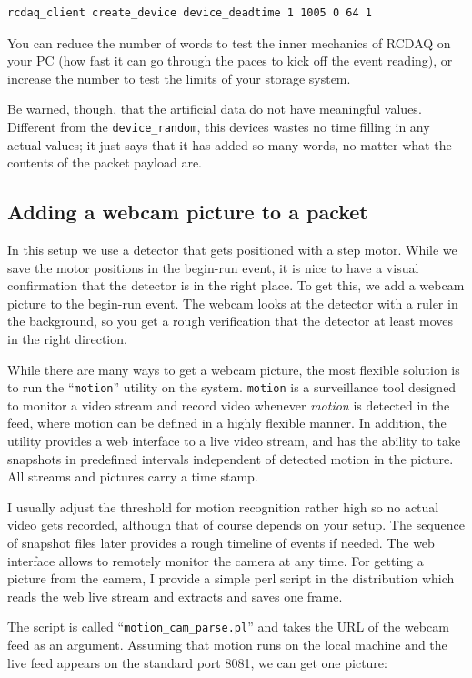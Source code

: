 \documentclass{article}[11pt]
\begin{document}
\begin{verbatim}
rcdaq_client create_device device_deadtime 1 1005 0 64 1
\end{verbatim}

You can reduce the number of words to test the inner mechanics of
RCDAQ on your PC (how fast it can go through the paces to kick off the
event reading), or increase the number to test the limits of your
storage system. 

Be warned, though, that the artificial data do not have meaningful
values. Different from the \verb|device_random|, this devices wastes
no time filling in any actual values; it just says that it has added
so many words, no matter what the contents of the packet payload are.

\subsection{Adding a webcam picture to a packet}

In this setup we use a detector that gets positioned with a step
motor. While we save the motor positions in the begin-run event, it is
nice to have a visual confirmation that the detector is in the right
place. To get this, we add a webcam picture to the begin-run
event. The webcam looks at the detector with a ruler in the
background, so you get a rough verification that the detector at least
moves in the right direction.

While there are many ways to get a webcam picture, the most flexible
solution is to run the ``\verb|motion|'' utility on the
system. \verb|motion| is a surveillance tool designed to monitor a
video stream and record video whenever \emph{motion} is detected in
the feed, where motion can be defined in a highly flexible manner. In
addition, the utility provides a web interface to a live video stream,
and has the ability to take snapshots in predefined intervals
independent of detected motion in the picture. All streams and
pictures carry a time stamp.

I usually adjust the threshold for motion recognition rather high so
no actual video gets recorded, although that of course depends on your
setup. The sequence of snapshot files later provides a rough
timeline of events if needed. The web interface allows to remotely
monitor the camera at any time. For getting a picture from the camera,
I provide a simple perl script in the distribution which reads the web
live stream and extracts and saves one frame.

The script is called ``\verb|motion_cam_parse.pl|'' and takes the URL
of the webcam feed as an argument. Assuming that motion runs on the
local machine and the live feed appears on the standard port 8081, we can
get one picture:
\end{document}
